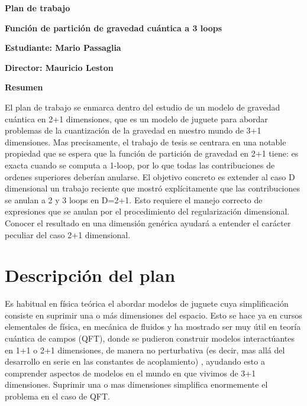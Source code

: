 \documentclass[A4paper,12pt]{article}
\begin{document}
	
	
\begin{center}
\Large {\bf Plan de trabajo}
\end{center}
\vspace{1cm}

\begin{center}
	\Large {\bf Función de partición de gravedad cuántica a 3 loops}
\end{center}
\vspace{1cm}

{\bf Estudiante: Mario Passaglia}

{\bf Director: Mauricio Leston}




\vspace{0.5cm}


{\bf Resumen}

\vspace{0.5cm}



El plan de trabajo se enmarca dentro del estudio de un modelo de gravedad cuántica en 2+1 dimensiones, que es un modelo de juguete para abordar problemas de la cuantización de la gravedad en nuestro mundo de 3+1 dimensiones. Mas precisamente, el trabajo de tesis se centrara en una notable propiedad que se espera que la función de partición de gravedad en 2+1 tiene: es exacta cuando se computa a 1-loop, por lo que todas las contribuciones de ordenes superiores deberían anularse. El objetivo concreto es extender al caso D dimensional un trabajo reciente que mostró explícitamente que las contribuciones se anulan a 2 y 3 loops en D=2+1. Esto requiere el manejo correcto de expresiones que se anulan por el procedimiento del regularización dimensional. Conocer el resultado en una dimensión genérica ayudará a entender el carácter peculiar del caso 2+1 dimensional.


\section*{Descripción del plan}

Es habitual en física teórica el abordar modelos de juguete  cuya simplificación consiste en suprimir una o más dimensiones del espacio. Esto se hace ya en cursos elementales de física, en mecánica de fluidos y ha mostrado ser muy útil en teoría cuántica de campos (QFT), donde se pudieron construir modelos interactúantes en 1+1 o 2+1 dimensiones, de manera no perturbativa (es decir, mas allá del desarrollo en serie en las constantes de acoplamiento) , ayudando esto a comprender aspectos de modelos en el mundo en que vivimos de 3+1 dimensiones. Suprimir una o mas dimensiones simplifica enormemente el problema en el caso de QFT.
\end{document}
